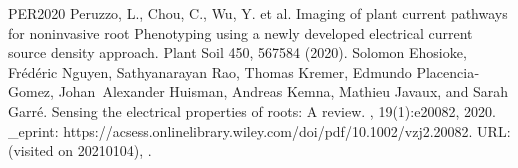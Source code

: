 \documentclass[letterpaper,10pt,english]{sphinxmanual}
\begin{document}
\begin{sphinxthebibliography}{PER2020}
\sphinxAtStartPar
Peruzzo, L., Chou, C., Wu, Y. et al. Imaging of plant current pathways for non\sphinxhyphen{}invasive root Phenotyping using a newly developed electrical current source density approach. Plant Soil 450, 567\textendash{}584 (2020). 
\sphinxAtStartPar
Solomon Ehosioke, Frédéric Nguyen, Sathyanarayan Rao, Thomas Kremer, Edmundo Placencia‐Gomez, Johan Alexander Huisman, Andreas Kemna, Mathieu Javaux, and Sarah Garré. Sensing the electrical properties of roots: A review. , 19(1):e20082, 2020. \_eprint: https://acsess.onlinelibrary.wiley.com/doi/pdf/10.1002/vzj2.20082. URL:  (visited on 2021\sphinxhyphen{}01\sphinxhyphen{}04), .
\end{sphinxthebibliography}



\renewcommand{\indexname}{Index}
\printindex
\end{document}
